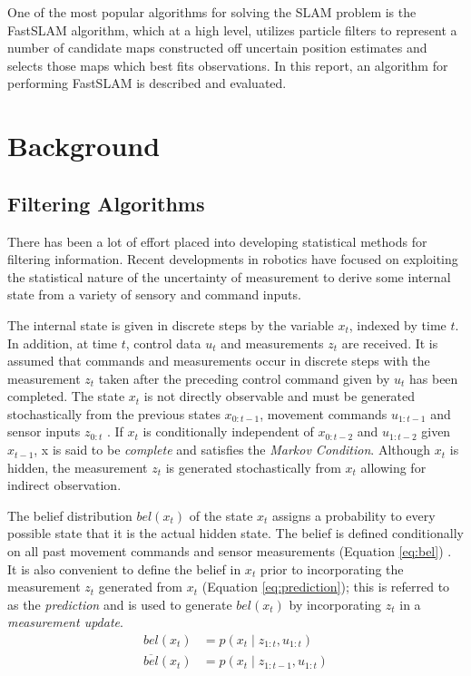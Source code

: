\documentclass[english]{article}
\begin{document}
One of the most popular algorithms for solving the SLAM problem is the FastSLAM algorithm, which at a high level, utilizes particle filters to represent a number of candidate maps constructed off uncertain position estimates and selects those maps which best fits observations. In this report, an algorithm for performing FastSLAM is described and evaluated.

\section{Background}

\subsection{Filtering Algorithms}
\label{sec:filtering}
There has been a lot of effort placed into developing statistical methods for filtering information. Recent developments in robotics have focused on exploiting the statistical nature of the uncertainty of measurement to derive some internal state from a variety of sensory and command inputs.

The internal state is given in discrete steps by the variable $x_t$, indexed by time $t$. In addition, at time $t$, control data $u_t$ and measurements $z_t$ are received. It is assumed that commands and measurements occur in discrete steps with the measurement $z_t$ taken after the preceding control command given by $u_t$ has been completed. The state $x_t$ is not directly observable and must be generated stochastically from the previous states $x_{0:t-1}$, movement commands $u_{1:t-1}$ and sensor inputs $z_{0:t}$ \cite{Thrun02d}. If $x_t$ is conditionally independent of $x_{0:t-2}$ and $u_{1:t-2}$ given $x_{t-1}$, x is said to be \emph{complete} and satisfies the \emph{Markov Condition}\cite{probrob}. Although $x_t$ is hidden, the measurement $z_t$ is generated stochastically from $x_t$ allowing for indirect observation\cite{Thrun02d}.

The belief distribution $bel(x_t)$ of the state $x_t$ assigns a probability to every possible state that it is the actual hidden state. The belief is defined conditionally on all past movement commands and sensor measurements (Equation \ref{eq:bel}) \cite{probrob}. It is also convenient to define the belief in $x_t$ prior to incorporating the measurement $z_t$ generated from $x_t$ (Equation \ref{eq:prediction}); this is referred to as the \emph{prediction} and is used to generate $bel(x_t)$ by incorporating $z_t$ in a \emph{measurement update}.
\begin {align}
  bel(x_t) & = p(x_t \mid z_{1:t},u_{1:t}) \label{eq:bel} \\   
  \overline{bel}(x_t) & = p(x_t \mid z_{1:t-1}, u_{1:t}) \label{eq:prediction}
\end {align}
\end{document}
